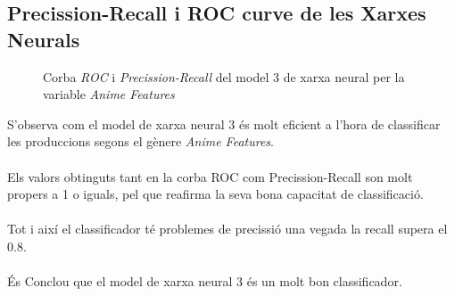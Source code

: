 \documentclass[a4paper, 11pt]{article}
\begin{document}
\subsection{Precission-Recall i ROC curve de les Xarxes Neurals}
\begin{figure}[h]
\centering
    \caption{Corba \textit{ROC} i \textit{Precission-Recall} del model 3 de xarxa neural per la variable \textit{Anime Features}}
    \label{fig:my_label}
\end{figure}
\hspace{-1.5em}S'observa com el model de xarxa neural 3 és molt eficient a l'hora de classificar les produccions segons el gènere \textit{Anime Features}.\\\\
Els valors obtinguts tant en la corba ROC com Precission-Recall son molt propers a 1 o iguals, pel que reafirma la seva bona capacitat de classificació.
\\\\
Tot i així el classificador té problemes de precissió una vegada la recall supera el 0.8.\\\\
És Conclou que el model de xarxa neural 3 és un molt bon classificador.
\newpage 
\end{document}
